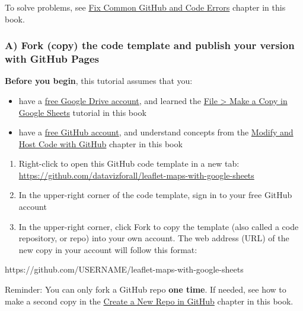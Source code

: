 \documentclass[
  english,
]{book}
\newenvironment{Shaded}{\begin{snugshade}}{\end{snugshade}}
\newcommand{\NormalTok}[1]{#1}
\providecommand{\tightlist}{%
  \setlength{\itemsep}{0pt}\setlength{\parskip}{0pt}}
\begin{document}
To solve problems, see \href{fix-code}{Fix Common GitHub and Code Errors} chapter in this book.

\hypertarget{a-fork-copy-the-code-template-and-publish-your-version-with-github-pages}{%
\subsubsection*{A) Fork (copy) the code template and publish your version with GitHub Pages}\label{a-fork-copy-the-code-template-and-publish-your-version-with-github-pages}}

\textbf{Before you begin}, this tutorial assumes that you:

\begin{itemize}
\tightlist
\item
  have a \href{http://drive.google.com}{free Google Drive account}, and learned the \href{copy}{File \textgreater{} Make a Copy in Google Sheets} tutorial in this book
\item
  have a \href{http://github.com}{free GitHub account}, and understand concepts from the \href{github}{Modify and Host Code with GitHub} chapter in this book
\end{itemize}

\begin{enumerate}
\def\labelenumi{\arabic{enumi})}
\item
  Right-click to open this GitHub code template in a new tab: \url{https://github.com/datavizforall/leaflet-maps-with-google-sheets}
\item
  In the upper-right corner of the code template, sign in to your free GitHub account
\item
  In the upper-right corner, click Fork to copy the template (also called a code repository, or repo) into your own account.
  The web address (URL) of the new copy in your account will follow this format:
\end{enumerate}

\begin{Shaded}
\begin{Highlighting}[]
\NormalTok{https://github.com/USERNAME/leaflet{-}maps{-}with{-}google{-}sheets}
\end{Highlighting}
\end{Shaded}

Reminder: You can only fork a GitHub repo \textbf{one time}. If needed, see how to make a second copy in the \href{create-repo}{Create a New Repo in GitHub} chapter in this book.
\end{document}
